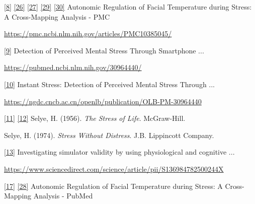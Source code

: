 \documentclass[12pt,a4paper]{article}
\begin{document}
\href{https://pmc.ncbi.nlm.nih.gov/articles/PMC10385045/\#:~:text=Numerous\%20studies\%20have\%20investigated\%20the,natural\%20physiological\%20responses\%20under\%20study}{{[}8{]}} \href{https://pmc.ncbi.nlm.nih.gov/articles/PMC10385045/\#:~:text=Skin\%20temperature\%20reflects\%20the\%20Autonomic,CM}{{[}26{]}} \href{https://pmc.ncbi.nlm.nih.gov/articles/PMC10385045/\#:~:text=responsible\%20for\%20the\%20thermal\%20modulation,6\%20\%2C\%2030\%2C10}{{[}27{]}} \href{https://pmc.ncbi.nlm.nih.gov/articles/PMC10385045/\#:~:text=both\%20conditions\%2C\%20which\%20was\%20not,signals\%20significantly\%20varies\%20with\%20gender}{{[}29{]}} \href{https://pmc.ncbi.nlm.nih.gov/articles/PMC10385045/\#:~:text=Among\%20the\%20facial\%20regions\%2C\%20the,as\%20shown\%20in\%20Figure\%204}{{[}30{]}} Autonomic Regulation of Facial Temperature during Stress: A Cross-Mapping Analysis - PMC

\url{https://pmc.ncbi.nlm.nih.gov/articles/PMC10385045/}

\href{https://pubmed.ncbi.nlm.nih.gov/30964440/\#:~:text=,cheap\%2C\%20convenient\%2C\%20and\%20mobile}{{[}9{]}} Detection of Perceived Mental Stress Through Smartphone ...

\url{https://pubmed.ncbi.nlm.nih.gov/30964440/}

\href{https://ngdc.cncb.ac.cn/openlb/publication/OLB-PM-30964440\#:~:text=camera\%20can\%20be\%20used\%20to,convenient\%2C\%20and\%20mobile\%20monitoring\%20systems}{{[}10{]}} Instant Stress: Detection of Perceived Mental Stress Through ...

\url{https://ngdc.cncb.ac.cn/openlb/publication/OLB-PM-30964440}

\href{Selye1956}{{[}11{]}} \href{Selye1974}{{[}12{]}} Selye, H. (1956). \emph{The Stress of Life}. McGraw-Hill.

Selye, H. (1974). \emph{Stress Without Distress}. J.B. Lippincott Company.

\href{https://www.sciencedirect.com/science/article/pii/S136984782500244X\#:~:text=,1994\%29\%2C\%20whereas}{{[}13{]}} Investigating simulator validity by using physiological and cognitive ...

\url{https://www.sciencedirect.com/science/article/pii/S136984782500244X}

\href{https://pubmed.ncbi.nlm.nih.gov/37514696/\#:~:text=regions\%20with\%20the\%20ANS\%20correlates,signals\%20significantly\%20varies\%20with\%20gender}{{[}17{]}} \href{https://pubmed.ncbi.nlm.nih.gov/37514696/\#:~:text=both\%20conditions\%2C\%20which\%20was\%20not,signals\%20significantly\%20varies\%20with\%20gender}{{[}28{]}} Autonomic Regulation of Facial Temperature during Stress: A Cross-Mapping Analysis - PubMed
\end{document}
